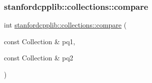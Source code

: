 \mbox{\label{classDeque_ac12ad2761ec7037f8866b726424a81e2}} 
\subsubsection{\texorpdfstring{stanfordcpplib\+::collections\+::compare}{stanfordcpplib::collections::compare}}
{\footnotesize\ttfamily int \mbox{\hyperlink{namespacestanfordcpplib_1_1collections_a6d113dfaa3d28a3894990c64411ff03c}{stanfordcpplib\+::collections\+::compare}} (\begin{DoxyParamCaption}\item[{const Collection \&}]{pq1,  }\item[{const Collection \&}]{pq2 }\end{DoxyParamCaption})\hspace{0.3cm}{\ttfamily [friend]}}

